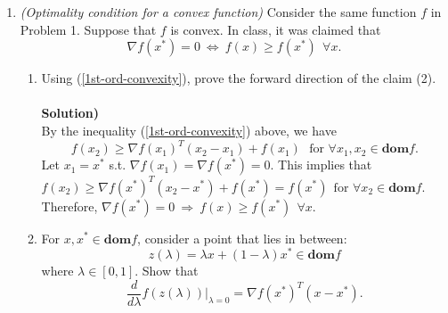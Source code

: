 \documentclass{article}
\begin{document}
\begin{enumerate}
\begin{enumerate}
(ii) (If (1) holds, then $f(x)$ is convex.)\\
Let $z=\lambda x+(1-\lambda)y$ for all $x,y\in \textbf{dom}f$. Then, we can write
\begin{align*}
	f(x)\geq \nabla f(z)^T(x-z)+f(z)\quad\cdots\quad\text{\textcircled{1}}\\
	f(y)\geq \nabla f(z)^T(y-z)+f(z)\quad\cdots\quad\text{\textcircled{2}}
\end{align*}
Then, $\lambda \cdot \text{\textcircled{1}}+(1-\lambda)\cdot \text{\textcircled{2}}$ can be written as
\begin{align*}
	\lambda f(x)+(1-\lambda)f(y)&\geq \nabla f(z)^T(\lambda x+(1-\lambda)y-z)+f(z)\\
	&\stackrel{(1)}{=}f(z)\\
	&=f(\lambda x+(1-\lambda)y)
\end{align*}
where (1) follows from the fact that $z=\lambda x+(1-\lambda)y$. By definition of convexity, this implies that $f(x)$ is convex.

\end{enumerate}

\item \textit{(Optimality condition for a convex function)} Consider the same function $f$ in Problem 1. Suppose that $f$ is convex. In class, it was claimed that
\begin{equation}
\nabla f(x^*) = 0 ~\Longleftrightarrow ~f(x) \geq f(x^*)~~ \forall x. \label{opt-condition}
\end{equation}

\begin{enumerate}
\item Using (\ref{1st-ord-convexity}), prove the forward direction of the claim (2).\\\\
\textbf{Solution)}\\
By the inequality (\ref{1st-ord-convexity}) above, we have \begin{equation*}
f(x_2) \geq \nabla f(x_1)^T(x_2 - x_1)+f(x_1)~~~ \text{for } \forall x_1 ,x_2 \in \textbf{dom}f.
\end{equation*}
Let $x_1 = x^*$ s.t. $\nabla f(x_1)=\nabla f(x^*)=0$. This implies that $f(x_2) \geq \nabla f(x^*)^T(x_2 - x^*)+f(x^*) = f(x^*)~~ \text{for } \forall x_2 \in \textbf{dom}f$. Therefore, $\nabla f(x^*) = 0 ~\Longrightarrow ~f(x) \geq f(x^*)~~ \forall x$. \\

\item For $x, x^* \in \textbf{dom}f$, consider a point that lies in between:
\begin{equation}
z(\lambda) = \lambda x + (1 - \lambda)x^* \in \textbf{dom}f \label{convex-comb}
\end{equation}
where $\lambda \in [0,1]$. Show that
\begin{equation}
\dfrac{d}{d\lambda} f(z(\lambda)) \Big|_{\lambda=0} = \nabla f(x^*)^T (x - x^*).
\end{equation}


\end{enumerate}
\end{enumerate}
\end{document}
